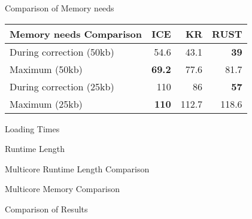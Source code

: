 \begin{frame}[c]{Comparison of Memory needs}
    \begin{tabular}{lrrr}
        \textbf{Memory needs Comparison} & ICE & KR & RUST \\
        \hline \pause
        During correction (50kb) &   54.6 & 43.1 & \textbf{39}   \\ \pause
        Maximum          (50kb) &   \textbf{69.2} & 77.6 & 81.7 \\ \pause
        During correction (25kb) &   110 & 86 & \textbf{57}  \\ \pause
        Maximum          (25kb) &   \textbf{110} & 112.7 & 118.6 \\
    \end{tabular}
\end{frame}


\begin{frame}[c]{Loading Times}
\end{frame}


\begin{frame}[c]{Runtime Length}
\end{frame}


\begin{frame}[c]{Multicore Runtime Length Comparison}
\end{frame}


\begin{frame}[c]{Multicore Memory Comparison}
\end{frame}



\begin{frame}[c]{Comparison of Results}
    \begin{figure}
    \subfloat[Uncorrected]{
    \texttt{[image: c\_50kb]}}
     \\
    \subfloat[KR]{             
    \texttt{[image: c\_kr\_50kb]}}
    \end{figure}
\end{frame}

